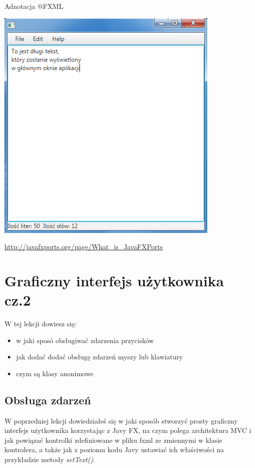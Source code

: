 \documentclass[letterpaper,10pt,english]{sphinxmanual}
\begin{document}
Adnotacja @FXML

{\hfill\includegraphics{end.png}\hfill}

\href{http://javafxports.org/page/What\_is\_JavaFXPorts}{http://javafxports.org/page/What\_is\_JavaFXPorts}


\section{Graficzny interfejs użytkownika cz.2}
\label{gui2:graficzny-interfejs-uzytkownika-cz-2}\label{gui2::doc}
W tej lekcji dowiesz się:
\begin{itemize}
\item {} 
w jaki sposó obsługiwać zdarzenia przycisków

\item {} 
jak dodać dodać obsługę zdarzeń myszy lub klawiatury

\item {} 
czym są klasy anonimowe

\end{itemize}


\subsection{Obsługa zdarzeń}
\label{gui2:obsluga-zdarzen}
W poprzedniej lekcji dowiedziałeś się w jaki sposób stworzyć prosty graficzny interfejs użytkownika korzystając z Javy FX, na czym polega architektura MVC i jak powiązać kontrolki zdefiniowane w pliku fxml ze zmiennymi w klasie kontrolera, a także jak z poziomu kodu Javy ustawiać ich właściwości na przykładzie metody \emph{setText()}.
\end{document}
